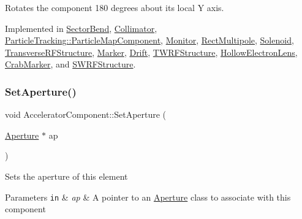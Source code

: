 Rotates the component 180 degrees about its local Y axis. 

Implemented in \hyperlink{classSectorBend_abd8059191bd4c947320b7fe5f6736e95}{Sector\+Bend}, \hyperlink{classCollimator_a89d782779f8e57af28eeb963078bbf20}{Collimator}, \hyperlink{classParticleTracking_1_1ParticleMapComponent_a32c2b78fc4688e14006f906d5e321d10}{Particle\+Tracking\+::\+Particle\+Map\+Component}, \hyperlink{classMonitor_ad4af2f46ca124bf0c958eca70a2c2769}{Monitor}, \hyperlink{classRectMultipole_afa249ac1d4f3b6c8c1171e5586731ffd}{Rect\+Multipole}, \hyperlink{classSolenoid_aff80a21647e92b9810f2058d9e8540b2}{Solenoid}, \hyperlink{classTransverseRFStructure_a1b016853604d6d2f1c21af600ff52fe0}{Transverse\+R\+F\+Structure}, \hyperlink{classMarker_aa1e927fe0a2eea626759daec624c97f3}{Marker}, \hyperlink{classDrift_abf387eddfcabfc81b186080f6301ce60}{Drift}, \hyperlink{classTWRFStructure_a04893d600099a41642de0634013c5091}{T\+W\+R\+F\+Structure}, \hyperlink{classHollowElectronLens_a8e806750ac6f8129d3be4a089303da36}{Hollow\+Electron\+Lens}, \hyperlink{classCrabMarker_a4b60620517f65b4e1f557300a3dbe89b}{Crab\+Marker}, and \hyperlink{classSWRFStructure_a886ea9cbbef4255f784f440be7c45a91}{S\+W\+R\+F\+Structure}.

\mbox{\label{classAcceleratorComponent_a5f1b3a0d7bb1b97730f7d7f1e2c968b0}} 
\subsubsection{\texorpdfstring{Set\+Aperture()}{SetAperture()}}
{\footnotesize\ttfamily void Accelerator\+Component\+::\+Set\+Aperture (\begin{DoxyParamCaption}\item[{\hyperlink{classAperture}{Aperture} $\ast$}]{ap }\end{DoxyParamCaption})\hspace{0.3cm}{\ttfamily [inline]}}

Sets the aperture of this element 
\begin{DoxyParams}[1]{Parameters}
\mbox{\tt in}  & {\em ap} & A pointer to an \hyperlink{classAperture}{Aperture} class to associate with this component \\
\hline
\end{DoxyParams}
\mbox{\label{classAcceleratorComponent_ad3014eb3d45b9991fbd6e4a01137355d}} 
